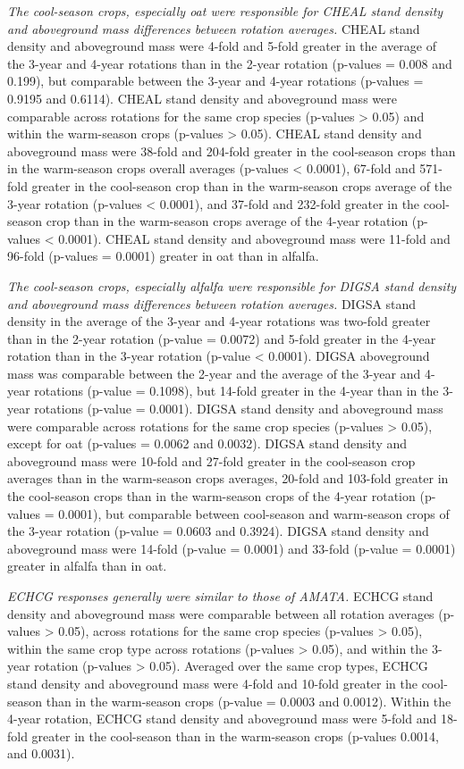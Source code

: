 \documentclass[
]{article}
\begin{document}
\emph{The cool-season crops, especially oat were responsible for CHEAL stand density and aboveground mass differences between rotation averages.} CHEAL stand density and aboveground mass were 4-fold and 5-fold greater in the average of the 3-year and 4-year rotations than in the 2-year rotation (p-values = 0.008 and 0.199), but comparable between the 3-year and 4-year rotations (p-values = 0.9195 and 0.6114). CHEAL stand density and aboveground mass were comparable across rotations for the same crop species (p-values \textgreater{} 0.05) and within the warm-season crops (p-values \textgreater{} 0.05). CHEAL stand density and aboveground mass were 38-fold and 204-fold greater in the cool-season crops than in the warm-season crops overall averages (p-values \textless{} 0.0001), 67-fold and 571-fold greater in the cool-season crop than in the warm-season crops average of the 3-year rotation (p-values \textless{} 0.0001), and 37-fold and 232-fold greater in the cool-season crop than in the warm-season crops average of the 4-year rotation (p-values \textless{} 0.0001). CHEAL stand density and aboveground mass were 11-fold and 96-fold (p-values = 0.0001) greater in oat than in alfalfa.

\emph{The cool-season crops, especially alfalfa were responsible for DIGSA stand density and aboveground mass differences between rotation averages.} DIGSA stand density in the average of the 3-year and 4-year rotations was two-fold greater than in the 2-year rotation (p-value = 0.0072) and 5-fold greater in the 4-year rotation than in the 3-year rotation (p-value \textless{} 0.0001). DIGSA aboveground mass was comparable between the 2-year and the average of the 3-year and 4-year rotations (p-value = 0.1098), but 14-fold greater in the 4-year than in the 3-year rotations (p-value = 0.0001). DIGSA stand density and aboveground mass were comparable across rotations for the same crop species (p-values \textgreater{} 0.05), except for oat (p-values = 0.0062 and 0.0032). DIGSA stand density and aboveground mass were 10-fold and 27-fold greater in the cool-season crop averages than in the warm-season crops averages, 20-fold and 103-fold greater in the cool-season crops than in the warm-season crops of the 4-year rotation (p-values = 0.0001), but comparable between cool-season and warm-season crops of the 3-year rotation (p-value = 0.0603 and 0.3924). DIGSA stand density and aboveground mass were 14-fold (p-value = 0.0001) and 33-fold (p-value = 0.0001) greater in alfalfa than in oat.

\emph{ECHCG responses generally were similar to those of AMATA.} ECHCG stand density and aboveground mass were comparable between all rotation averages (p-values \textgreater{} 0.05), across rotations for the same crop species (p-values \textgreater{} 0.05), within the same crop type across rotations (p-values \textgreater{} 0.05), and within the 3-year rotation (p-values \textgreater{} 0.05). Averaged over the same crop types, ECHCG stand density and aboveground mass were 4-fold and 10-fold greater in the cool-season than in the warm-season crops (p-value = 0.0003 and 0.0012). Within the 4-year rotation, ECHCG stand density and aboveground mass were 5-fold and 18-fold greater in the cool-season than in the warm-season crops (p-values 0.0014, and 0.0031).
\end{document}
